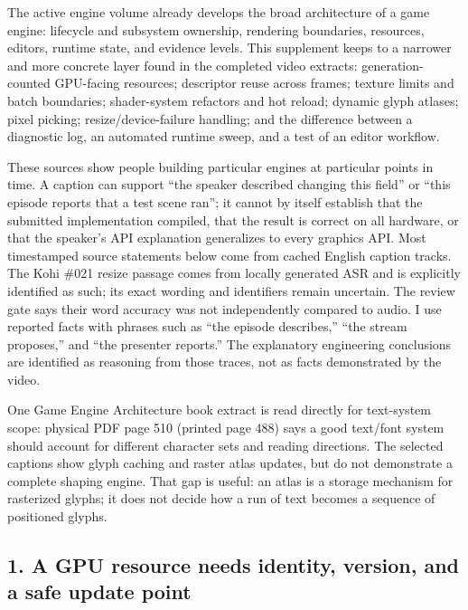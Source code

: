 \hypertarget{06-engine-ii-ch041-scope-and-evidence-contract}{}

The active engine volume already develops the broad architecture of a game engine: lifecycle and subsystem ownership, rendering boundaries, resources, editors, runtime state, and evidence levels. This supplement keeps to a narrower and more concrete layer found in the completed video extracts: generation-counted GPU-facing resources; descriptor reuse across frames; texture limits and batch boundaries; shader-system refactors and hot reload; dynamic glyph atlases; pixel picking; resize/device-failure handling; and the difference between a diagnostic log, an automated runtime sweep, and a test of an editor workflow.

These sources show people building particular engines at particular points in time. A caption can support ``the speaker described changing this field'' or ``this episode reports that a test scene ran''; it cannot by itself establish that the submitted implementation compiled, that the result is correct on all hardware, or that the speaker's API explanation generalizes to every graphics API. Most timestamped source statements below come from cached English caption tracks. The Kohi \#021 resize passage comes from locally generated ASR and is explicitly identified as such; its exact wording and identifiers remain uncertain. The review gate says their word accuracy was not independently compared to audio. I use reported facts with phrases such as ``the episode describes,'' ``the stream proposes,'' and ``the presenter reports.'' The explanatory engineering conclusions are identified as reasoning from those traces, not as facts demonstrated by the video.

One Game Engine Architecture book extract is read directly for text-system scope: physical PDF page 510 (printed page 488) says a good text/font system should account for different character sets and reading directions. The selected captions show glyph caching and raster atlas updates, but do not demonstrate a complete shaping engine. That gap is useful: an atlas is a storage mechanism for rasterized glyphs; it does not decide how a run of text becomes a sequence of positioned glyphs.

\subsection{1. A GPU resource needs identity, version, and a safe update point}\label{06-engine-ii-ch041-a-gpu-resource-needs-identity-version-and-a-safe-update-point}

